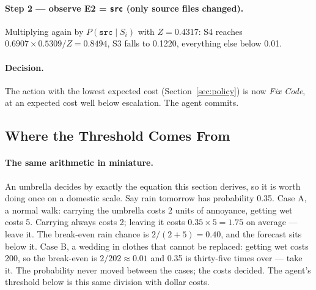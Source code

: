 \documentclass{article}
\begin{document}
\paragraph{Step 2 --- observe E2 = \texttt{src} (only source files changed).}
Multiplying again by $P(\texttt{src} \mid S_i)$ with $Z = 0.4317$: S4 reaches $0.6907 \times 0.5309 / Z = 0.8494$, S3 falls to 0.1220, everything else below 0.01.

\paragraph{Decision.} The action with the lowest expected cost (Section~\ref{sec:policy}) is now \emph{Fix Code}, at an expected cost well below escalation. The agent commits.

\subsection{Where the Threshold Comes From}
\label{sec:threshold}

\paragraph{The same arithmetic in miniature.} An umbrella decides by exactly the equation this section derives, so it is worth doing once on a domestic scale. Say rain tomorrow has probability 0.35. Case A, a normal walk: carrying the umbrella costs 2 units of annoyance, getting wet costs 5. Carrying always costs 2; leaving it costs $0.35 \times 5 = 1.75$ on average --- leave it. The break-even rain chance is $2/(2+5) = 0.40$, and the forecast sits below it. Case B, a wedding in clothes that cannot be replaced: getting wet costs 200, so the break-even is $2/202 \approx 0.01$ and 0.35 is thirty-five times over --- take it. The probability never moved between the cases; the costs decided. The agent's threshold below is this same division with dollar costs.
\end{document}
